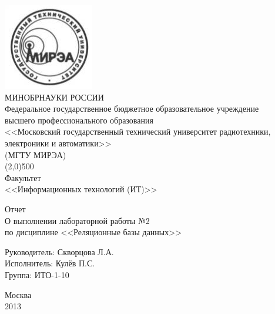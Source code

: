 \documentclass[a4paper, 12pt, titlepage]{article}
\begin{document}
\begin{otherlanguage}{russian}

\begin{titlepage}
\begin{center}
  \includegraphics[scale=0.5]{label.jpg}\\
  \vspace{20pt}
  МИНОБРНАУКИ РОССИИ\\
      Федеральное государственное бюджетное образовательное учреждение\\
      высшего профессионального образования\\
    <<Московский государственный технический университет радиотехники,\\
    электроники и автоматики>>\\ 
    (МГТУ МИРЭА)\\
    \line(2,0){500}\\
    \vspace{10pt}
    {\large Факультет\\
      \vspace{10pt}
      <<Информационных технологий (ИТ)>>}
\end{center}

\vspace{60pt}
\begin{center}
  {\large Отчет}\\
  \vspace{10pt}
  О выполнении лабораторной работы №2\\
  по дисциплине <<Реляционные базы данных>>\\
\end{center}
\vspace{\fill}
Руководитель: Скворцова Л.А.\\
Исполнитель: Кулёв П.С.\\
Группа: ИТО-1-10
\begin{center}
\vspace{\fill}
Москва\\2013
\end{center}
\end{titlepage}


\end{otherlanguage}
\end{document}
